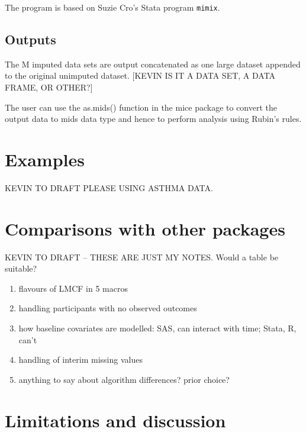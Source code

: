 The program is based on Suzie Cro’s Stata program \texttt{mimix}.

\subsection{Outputs}

The M imputed data sets are output concatenated as one large dataset appended to
the original unimputed dataset. [KEVIN IS IT A DATA SET, A DATA FRAME, OR OTHER?] 

The user can use the as.mids() function in the mice package to convert the output data  to mids data type and hence to perform analysis using Rubin's rules.



\section{Examples}

KEVIN TO DRAFT PLEASE USING ASTHMA DATA.


\section{Comparisons with other packages}

KEVIN TO DRAFT -- THESE ARE JUST MY NOTES. Would a table be suitable?

\begin{enumerate}
\item flavours of LMCF in 5 macros
\item handling participants with no observed outcomes
\item how baseline covariates are modelled: SAS, can interact with time; Stata, R, can't
\item handling of interim missing values
\item anything to say about algorithm differences? prior choice?
\end{enumerate}


\section{Limitations and discussion}

